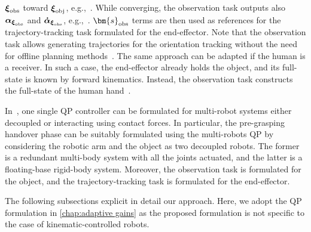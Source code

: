 $\boldsymbol{\xi}_{\rm obs}$ toward $\boldsymbol{\xi}_{\rm obj}$, e.g.,~\cite{paolillo2018ral}. While converging, the observation task outputs also $\boldsymbol{\alpha}_{\boldsymbol{\xi}_{\rm obs}}$ and $\boldsymbol{\dot{\alpha}}_{\boldsymbol{\xi}_{\rm obs}}$, e.g.,~\cite{pham2018pami}. $\bm{s}_{\rm obs}$ terms are then used as references for the trajectory-tracking task formulated for the end-effector. Note that the observation task allows generating trajectories for the orientation tracking without the need for offline planning methods~\cite{sciavicco2000book}. The same approach can be adapted if the human is a receiver. In such a case, the end-effector already holds the object, and its full-state is known by forward kinematics. Instead, the observation task constructs the full-state of the human hand~\cite{pham2018pami}. 

In~\cite{bouyarmane2019tro}, one single QP controller can be formulated for multi-robot systems either decoupled or interacting using contact forces. In particular, the pre-grasping handover phase can be suitably formulated using the multi-robots QP by considering the robotic arm and the object as two decoupled robots. The former is a redundant multi-body system with all the joints actuated, and the latter is a floating-base rigid-body system. Moreover, the observation task is formulated for the object, and the trajectory-tracking task is formulated for the end-effector. 

The following subsections explicit in detail our approach. Here, we adopt the QP formulation in \cref{chap:adaptive gains} as the proposed formulation is not specific to the case of kinematic-controlled robots.
